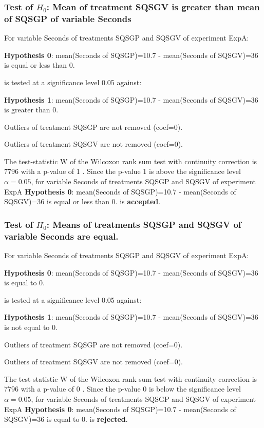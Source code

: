 \documentclass[18pt,c]{beamer}
\begin{document}
\begin{frame}[t]
 \frametitle{Test of $H_{0}$: Mean of treatment SQSGV is greater than mean of SQSGP of variable Seconds }
 \scriptsize
 For variable Seconds of treatments SQSGP and SQSGV of experiment ExpA:

\vspace{1mm}
{\bf Hypothesis 0}: mean(Seconds of SQSGP)=10.7 - mean(Seconds of SQSGV)=36 is equal or less than 0.


 \begin{center} is tested at a significance level 0.05 against: \end{center}

{\bf Hypothesis 1}: mean(Seconds of SQSGP)=10.7 - mean(Seconds of SQSGV)=36 is greater than 0.
\vspace{1mm}
\vspace{1mm}

 Outliers of treatment SQSGP  are not removed (coef=0).

 Outliers of treatment SQSGV  are not removed (coef=0).
\vspace{1mm}
 
 The test-statistic W of the Wilcoxon rank sum test with continuity correction is 7796 with a p-value of 1 .
 Since the p-value 1 is above the significance level $\alpha= 0.05 $,
 for variable Seconds of treatments SQSGP and SQSGV of experiment ExpA 
 {\bf Hypothesis 0}: mean(Seconds of SQSGP)=10.7 - mean(Seconds of SQSGV)=36 is equal or less than 0.
is {\bf accepted}.

 \end{frame}
\begin{frame}[t]
 \frametitle{Test of $H_{0}$: Means of treatments SQSGP and SQSGV of variable Seconds are equal. }
 \scriptsize
 For variable Seconds of treatments SQSGP and SQSGV of experiment ExpA:

\vspace{1mm}
{\bf Hypothesis 0}: mean(Seconds of SQSGP)=10.7 - mean(Seconds of SQSGV)=36 is equal to 0.


 \begin{center} is tested at a significance level 0.05 against: \end{center}

{\bf Hypothesis 1}: mean(Seconds of SQSGP)=10.7 - mean(Seconds of SQSGV)=36 is not equal to 0.
\vspace{1mm}
\vspace{1mm}

 Outliers of treatment SQSGP  are not removed (coef=0).

 Outliers of treatment SQSGV  are not removed (coef=0).
\vspace{1mm}
 
 The test-statistic W of the Wilcoxon rank sum test with continuity correction is 7796 with a p-value of 0 .
 Since the p-value 0 is below the significance level $\alpha= 0.05 $,
 for variable Seconds of treatments SQSGP and SQSGV of experiment ExpA 
 {\bf Hypothesis 0}: mean(Seconds of SQSGP)=10.7 - mean(Seconds of SQSGV)=36 is equal to 0.
is {\bf rejected}.

 \end{frame}
\end{document}

